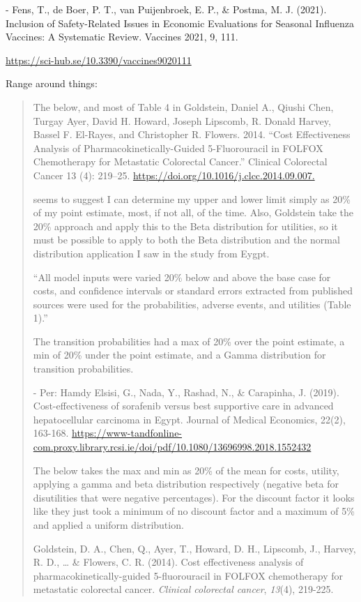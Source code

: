 \documentclass[
]{article}
\begin{document}
- Fens, T., de Boer, P. T., van Puijenbroek, E. P., \& Postma, M. J.
(2021). Inclusion of Safety-Related Issues in Economic Evaluations for
Seasonal Influenza Vaccines: A Systematic Review. Vaccines 2021, 9, 111.

\url{https://sci-hub.se/10.3390/vaccines9020111}

Range around things:

\begin{quote}
The below, and most of Table 4 in Goldstein, Daniel A., Qiushi Chen,
Turgay Ayer, David H. Howard, Joseph Lipscomb, R. Donald Harvey, Bassel
F. El-Rayes, and Christopher R. Flowers. 2014. ``Cost Effectiveness
Analysis of Pharmacokinetically-Guided 5-Fluorouracil in FOLFOX
Chemotherapy for Metastatic Colorectal Cancer.'' Clinical Colorectal
Cancer 13 (4): 219--25.
\url{https://doi.org/10.1016/j.clcc.2014.09.007.}

seems to suggest I can determine my upper and lower limit simply as 20\%
of my point estimate, most, if not all, of the time. Also, Goldstein
take the 20\% approach and apply this to the Beta distribution for
utilities, so it must be possible to apply to both the Beta distribution
and the normal distribution application I saw in the study from Eygpt.

``All model inputs were varied 20\% below and above the base case for
costs, and confidence intervals or standard errors extracted from
published sources were used for the probabilities, adverse events, and
utilities (Table 1).''

The transition probabilities had a max of 20\% over the point estimate,
a min of 20\% under the point estimate, and a Gamma distribution for
transition probabilities.

- Per: Hamdy Elsisi, G., Nada, Y., Rashad, N., \& Carapinha, J. (2019).
Cost-effectiveness of sorafenib versus best supportive care in advanced
hepatocellular carcinoma in Egypt. Journal of Medical Economics, 22(2),
163-168.
\url{https://www-tandfonline-com.proxy.library.rcsi.ie/doi/pdf/10.1080/13696998.2018.1552432}

The below takes the max and min as 20\% of the mean for costs, utility,
applying a gamma and beta distribution respectively (negative beta for
disutilities that were negative percentages). For the discount factor it
looks like they just took a minimum of no discount factor and a maximum
of 5\% and applied a uniform distribution.

Goldstein, D. A., Chen, Q., Ayer, T., Howard, D. H., Lipscomb, J.,
Harvey, R. D., \ldots{} \& Flowers, C. R. (2014). Cost effectiveness
analysis of pharmacokinetically-guided 5-fluorouracil in FOLFOX
chemotherapy for metastatic colorectal cancer. \emph{Clinical colorectal
cancer}, \emph{13}(4), 219-225.


\end{quote}
\end{document}
